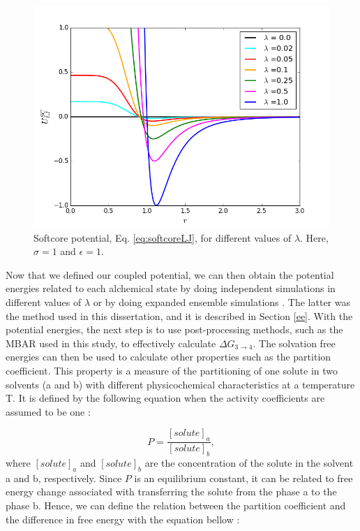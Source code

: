 \begin{figure}[H]
	\centering
	\includegraphics[width=0.8\linewidth]{Figures/soft}
	\caption{Softcore potential, Eq. \ref{eq:softcoreLJ}, for different values of $\lambda$. Here, $\sigma=1$ and $\epsilon=1$.}
	\label{fig:SC}
\end{figure}

Now that we defined our coupled potential, we can then obtain the potential energies related to each alchemical state by doing independent simulations in different values of $\lambda$ or by doing expanded ensemble simulations \cite{lyubartsev}. The latter was the method used in this dissertation, and it is described in Section \ref{ee}. With the potential energies, the next step is to use post-processing methods, such as the MBAR used in this study, to effectively calculate $\Delta G_{3 \rightarrow 4}$.  The solvation free energies can then be used to calculate other properties such as the partition coefficient. This property is a measure of the partitioning of one solute in two solvents (a and b) with different physicochemical characteristics  at a temperature T. It is defined by the following equation when the activity coefficients are assumed to be one \cite{doi:10.1021/ja00036a009}:

\begin{equation}
P = \dfrac{[solute]_{a}}{[solute]_{b}},
\end{equation} 
where $[solute]_{a}$ and $[solute]_{b}$ are the concentration of the solute in the solvent a and b, respectively. Since $P$ is an equilibrium constant, it can be related to free energy change associated with transferring the solute from the phase a to the phase b. Hence, we can define the relation between the partition coefficient and the difference in free energy with the equation bellow \cite{doi:10.1021/ja00036a009}:  

